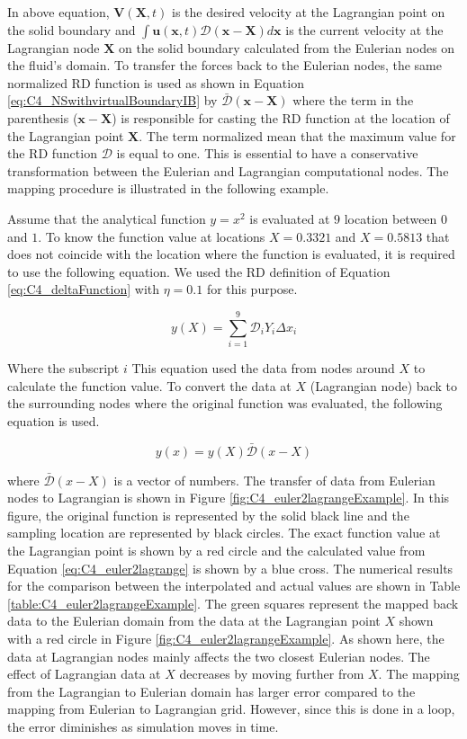 In above equation, $\mathbf{V}(\mathbf{X}, t)$ is the desired velocity at the Lagrangian point on the solid boundary and $\int \mathbf{u}(\mathbf{x}, t) \mathcal{D}(\mathbf{x} - \mathbf{X}) d\mathbf{x}$ is the current velocity at the Lagrangian node $\mathbf{X}$ on the solid boundary calculated from the Eulerian nodes on the fluid's domain. To transfer the forces back to the Eulerian nodes, the same normalized RD function is used as shown in Equation \eqref{eq:C4_NSwithvirtualBoundaryIB} by $\bar{\mathcal{D}}(\mathbf{x} - \mathbf{X})$ where the term in the parenthesis ($\mathbf{x} - \mathbf{X}$) is responsible for casting the RD function at the location of the Lagrangian point $\mathbf{X}$. The term normalized mean that the maximum value for the RD function $\mathcal{D}$ is equal to one. This is essential to have a conservative transformation between the Eulerian and Lagrangian computational nodes. The mapping procedure is illustrated in the following example.

Assume that the analytical function $y=x^2$ is evaluated at $9$ location between $0$ and $1$. To know the function value at locations $X = 0.3321$ and $X = 0.5813$ that does not coincide with the location where the function is evaluated, it is required to use the following equation. We used the RD definition of Equation \eqref{eq:C4_deltaFunction} with $\eta = 0.1$ for this purpose.

\begin{equation}\label{eq:C4_euler2lagrange}
    y(X) = \sum_{i=1}^9 \mathcal{D}_i Y_i \Delta x_i
\end{equation}

Where the subscript $i$ This equation used the data from nodes around $X$ to calculate the function value. To convert the data at $X$ (Lagrangian node) back to the surrounding nodes where the original function was evaluated, the following equation is used.

\begin{equation}
    y(x) = y(X) \bar{\mathcal{D}}(x - X)
\end{equation}

where $\bar{\mathcal{D}}(x - X)$ is a vector of numbers. The transfer of data from Eulerian nodes to Lagrangian is shown in Figure \ref{fig:C4_euler2lagrangeExample}. In this figure, the original function is represented by the solid black line and the sampling location are represented by black circles. The exact function value at the Lagrangian point is shown by a red circle and the calculated value from Equation \eqref{eq:C4_euler2lagrange} is shown by a blue cross. The numerical results for the comparison between the interpolated and actual values are shown in Table \ref{table:C4_euler2lagrangeExample}. The green squares represent the mapped back data to the Eulerian domain from the data at the Lagrangian point $X$ shown with a red circle in Figure \ref{fig:C4_euler2lagrangeExample}. As shown here, the data at Lagrangian nodes mainly affects the two closest Eulerian nodes. The effect of Lagrangian data at $X$ decreases by moving further from $X$. The mapping from the Lagrangian to Eulerian domain has larger error compared to the mapping from Eulerian to Lagrangian grid. However, since this is done in a loop, the error diminishes as simulation moves in time.

